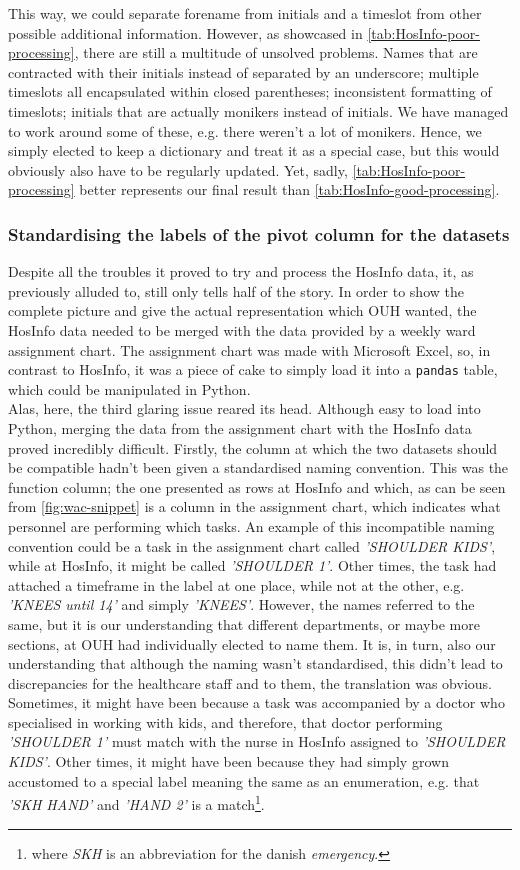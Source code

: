 This way, we could separate forename from initials and a timeslot from other possible additional information. However, as showcased in \autoref{tab:HosInfo-poor-processing}, there are still a multitude of unsolved problems. Names that are contracted with their initials instead of separated by an underscore; multiple timeslots all encapsulated within closed parentheses; inconsistent formatting of timeslots; initials that are actually monikers instead of initials. We have managed to work around some of these, e.g. there weren't a lot of monikers. Hence, we simply elected to keep a \gls{dictionary} and treat it as a special case, but this would obviously also have to be regularly updated. Yet, sadly, \autoref{tab:HosInfo-poor-processing} better represents our final result than \autoref{tab:HosInfo-good-processing}.

\subsubsection*{Standardising the labels of the pivot column for the datasets}
Despite all the troubles it proved to try and process the HosInfo data, it, as previously alluded to,  still only tells half of the story. In order to show the complete picture and give the actual representation which OUH wanted, the HosInfo data needed to be merged with the data provided by a weekly ward assignment chart. The assignment chart was made with Microsoft Excel, so, in contrast to HosInfo, it was a piece of cake to simply load it into a \texttt{pandas} table, which could be manipulated in Python.
\\
Alas, here, the third glaring issue reared its head. Although easy to load into Python, merging the data from the assignment chart with the HosInfo data proved incredibly difficult. Firstly, the column at which the two datasets should be compatible hadn't been given a standardised naming convention. This was the \gls{function} column; the one presented as rows at HosInfo and which, as can be seen from \autoref{fig:wac-snippet} is a column in the assignment chart, which indicates what personnel are performing which tasks. An example of this incompatible naming convention could be a task in the assignment chart called \emph{'SHOULDER KIDS'}, while at HosInfo, it might be called \emph{'SHOULDER 1'}. Other times, the task had attached a timeframe in the label at one place, while not at the other, e.g. \emph{'KNEES until 14'} and simply \emph{'KNEES'}. However, the names referred to the same, but it is our understanding that different departments, or maybe more sections, at OUH had individually elected to name them. It is, in turn, also our understanding that although the naming wasn't standardised, this didn't lead to discrepancies for the healthcare staff and to them, the translation was obvious. Sometimes, it might have been because a task was accompanied by a doctor who specialised in working with kids, and therefore, that doctor performing \emph{'SHOULDER 1'} must match with the nurse in HosInfo assigned to \emph{'SHOULDER KIDS'}. Other times, it might have been because they had simply grown accustomed to a special label meaning the same as an enumeration, e.g. that \emph{'SKH HAND'} and \emph{'HAND 2'} is a match\footnote{where \emph{SKH} is an abbreviation for the danish \emph{emergency}.}.

